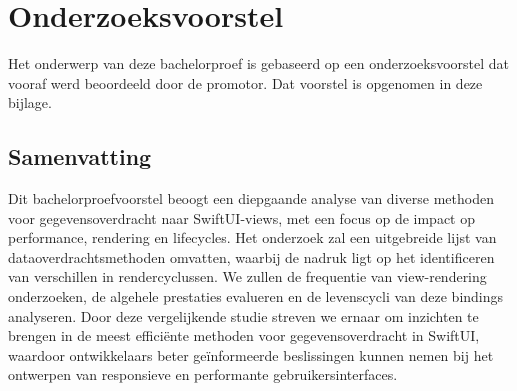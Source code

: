 \documentclass[dutch,dit,thesis]{hogentreport}
\begin{document}





%
%




\appendix

\chapter{Onderzoeksvoorstel}

Het onderwerp van deze bachelorproef is gebaseerd op een onderzoeksvoorstel dat vooraf werd beoordeeld door de promotor. Dat voorstel is opgenomen in deze bijlage.

\section*{Samenvatting}

Dit bachelorproefvoorstel beoogt een diepgaande analyse van diverse methoden voor gegevensoverdracht naar
SwiftUI-views, met een focus op de impact op performance, rendering en lifecycles. Het onderzoek zal een uitgebreide
lijst van dataoverdrachtsmethoden omvatten, waarbij de nadruk ligt op het identificeren van verschillen
in rendercyclussen. We zullen de frequentie van view-rendering onderzoeken, de algehele prestaties evalueren
en de levenscycli van deze bindings analyseren. Door deze vergelijkende studie streven we ernaar om inzichten
te brengen in de meest efficiënte methoden voor gegevensoverdracht in SwiftUI, waardoor ontwikkelaars beter
geïnformeerde beslissingen kunnen nemen bij het ontwerpen van responsieve en performante gebruikersinterfaces.





%


\backmatter{}

\setlength\bibitemsep{2pt} %
\printbibliography[heading=bibintoc]
\end{document}
